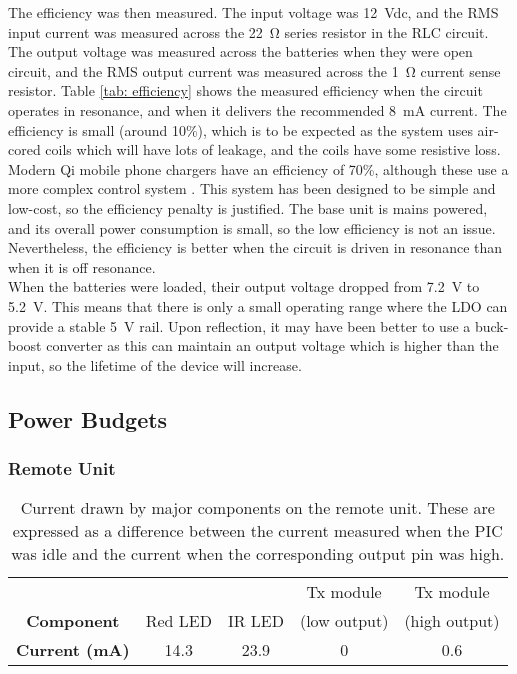 The efficiency was then measured. The input voltage was \SI{12}{\volt}dc, and the RMS input current was measured across the \SI{22}{\ohm} series resistor in the RLC circuit. The output voltage was measured across the batteries when they were open circuit, and the RMS output current was measured across the \SI{1}{\ohm} current sense resistor. Table \ref{tab: efficiency} shows the measured efficiency when the circuit operates in resonance, and when it delivers the recommended \SI{8}{\milli\ampere} current. The efficiency is small (around 10\%), which is to be expected as the system uses air-cored coils which will have lots of leakage, and the coils have some resistive loss. Modern Qi mobile phone chargers have an efficiency of 70\%, although these use a more complex control system \cite{wireless_power_review}. This system has been designed to be simple and low-cost, so the efficiency penalty is justified. The base unit is mains powered, and its overall power consumption is small, so the low efficiency is not an issue. Nevertheless, the efficiency is better when the circuit is driven in resonance than when it is off resonance.\\ %

When the batteries were loaded, their output voltage dropped from \SI{7.2}{\volt} to \SI{5.2}{\volt}. This means that there is only a small operating range where the LDO can provide a stable \SI{5}{\volt} rail. Upon reflection, it may have been better to use a buck-boost converter as this can maintain an output voltage which is higher than the input, so the lifetime of the device will increase.






\subsection{Power Budgets}\label{power budget}
\subsubsection{Remote Unit}

\begin{table}[ht]
	\begin{center}
	\caption{Current drawn by major components on the remote unit. These are expressed as a difference between the current measured when the PIC was idle and the current when the corresponding output pin was high.}
	\label{tab: remote current}
	\begin{tabular}{|c|c|c|c|c|}
	\hline
	& & & Tx module & Tx module\\
	\textbf{Component} & Red LED & IR LED & (low output) & (high output)\\
	\hline
	\textbf{Current (mA)} & 14.3 & 23.9 & 0 & 0.6 \\
	\hline
	\end{tabular}
	\end{center}
\end{table}

